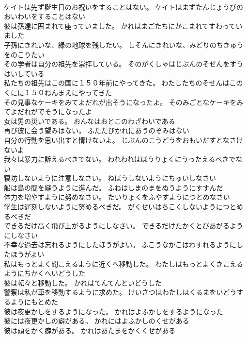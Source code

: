 \documentclass[8pt]{extreport}
\begin{document}
\begin{CJK}{UTF8}{min}
\\	ケイトは先ず誕生日のお祝いをすることはない。	ケイトはまずたんじょうびのおいわいをすることはない 
\\	彼は孫達に囲まれて座っていました。	かれはまごたちにかこまれてすわっていました 
\\	子孫にきれいな、緑の地球を残したい。	しそんにきれいな、みどりのちきゅうをのこりたい 
\\	その学者は自分の祖先を崇拝している。	そのがくしゃはじぶんのそせんをすうはいしている 
\\	私たちの祖先はこの国に１５０年前にやってきた。	わたしたちのそせんはこのくにに１５０ねんまえにやってきた 
\\	その見事なケーキをみてよだれが出そうになったよ。	そのみごとなケーキをみてよだれがでそうになったよ 
\\	女は男の災いである。	おんなはおとこのわざわいである 
\\	再び彼に会う望みはない。	ふたたびかれにあうのぞみはない 
\\	自分の行動を思い出すと情けないよ。	じぶんのこうどうをおもいだすとなさけないよ 
\\	我々は暴力に訴えるべきでない。	われわれはぼうりょくにうったえるべきでない 
\\	寝坊しないように注意しなさい。	ねぼうしないようにちゅいしなさい 
\\	船は島の間を縫うように進んだ。	ふねはしまのまをぬうようにすすんだ 
\\	体力を増やすように努めなさい。	たいりょくをふやすようにつとめなさい 
\\	学生は遅刻しないように努めるべきだ。	がくせいはちこくしないようにつとめるべきだ 
\\	できるだけ高く飛び上がるようにしなさい。	できるだけたかくとびあがるようにしなさい 
\\	不幸な過去は忘れるようにしたほうがよい。	ふこうなかこはわすれるようにしたほうがよい 
\\	私はもっとよく聞こえるように近くへ移動した。	わたしはもっとよくきこえるようにちかくへいどうした 
\\	彼は転々と移動した。	かれはてんてんといどうした 
\\	警察は私が車を移動するように求めた。	けいさつはわたしはくるまをいどうするようにもとめた 
\\	彼は夜更かしをするようになった。	かれはよふかしをするようになった 
\\	彼には夜更かしの癖がある。	かれにはよふかしのくせがある 
\\	彼は頭をかく癖がある。	かれはあたまをかくくせがある 

\end{CJK}
\end{document}
